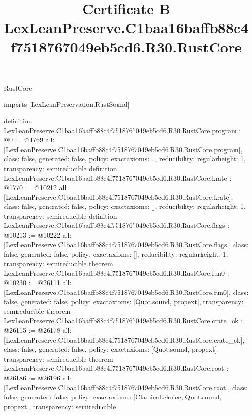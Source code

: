 \begin{lexlean}{RustCore}
\title{Certificate B LexLeanPreserve.C1baa16baffb88c4f7518767049eb5cd6.R30.RustCore}
\begin{coremodule}
imports [LexLeanPreservation.RustSound]

definition LexLeanPreserve.C1baa16baffb88c4f7518767049eb5cd6.R30.RustCore.program : @0 := @1769 {
  all: [LexLeanPreserve.C1baa16baffb88c4f7518767049eb5cd6.R30.RustCore.program],
  class: false,
  generated: false,
  policy: exact{axioms: []},
  reducibility: regular{height: 1},
  transparency: semireducible
}
definition LexLeanPreserve.C1baa16baffb88c4f7518767049eb5cd6.R30.RustCore.krate : @1770 := @10212 {
  all: [LexLeanPreserve.C1baa16baffb88c4f7518767049eb5cd6.R30.RustCore.krate],
  class: false,
  generated: false,
  policy: exact{axioms: []},
  reducibility: regular{height: 1},
  transparency: semireducible
}
definition LexLeanPreserve.C1baa16baffb88c4f7518767049eb5cd6.R30.RustCore.flags : @10213 := @10222 {
  all: [LexLeanPreserve.C1baa16baffb88c4f7518767049eb5cd6.R30.RustCore.flags],
  class: false,
  generated: false,
  policy: exact{axioms: []},
  reducibility: regular{height: 1},
  transparency: semireducible
}
theorem LexLeanPreserve.C1baa16baffb88c4f7518767049eb5cd6.R30.RustCore.fun0 : @10230 := @26111 {
  all: [LexLeanPreserve.C1baa16baffb88c4f7518767049eb5cd6.R30.RustCore.fun0],
  class: false,
  generated: false,
  policy: exact{axioms: [Quot.sound, propext]},
  transparency: semireducible
}
theorem LexLeanPreserve.C1baa16baffb88c4f7518767049eb5cd6.R30.RustCore.crate_ok : @26115 := @26178 {
  all: [LexLeanPreserve.C1baa16baffb88c4f7518767049eb5cd6.R30.RustCore.crate_ok],
  class: false,
  generated: false,
  policy: exact{axioms: [Quot.sound, propext]},
  transparency: semireducible
}
theorem LexLeanPreserve.C1baa16baffb88c4f7518767049eb5cd6.R30.RustCore.root : @26186 := @26196 {
  all: [LexLeanPreserve.C1baa16baffb88c4f7518767049eb5cd6.R30.RustCore.root],
  class: false,
  generated: false,
  policy: exact{axioms: [Classical.choice, Quot.sound, propext]},
  transparency: semireducible
}


\end{coremodule}
\end{lexlean}
